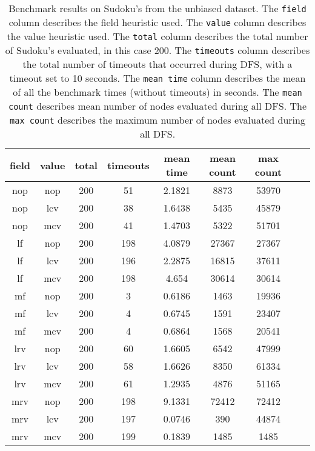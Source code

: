 \documentclass[a4paper]{article}
\begin{document}
\begin{table}[h]
	\begin{adjustbox}{center}
		\begin{tabular}{|c|c|c|c|c|c|c|c|c|}\hline
		\textbf{field} & \textbf{value} & \textbf{total} & \textbf{timeouts} & \textbf{mean time} & \textbf{mean count} & \textbf{max count} \\\hline
		nop & nop & 200 & 51  & 2.1821 & 8873  & 53970 \\\hline
		nop & lcv & 200 & 38  & 1.6438 & 5435  & 45879 \\\hline
		nop & mcv & 200 & 41  & 1.4703 & 5322  & 51701 \\\hline
		lf  & nop & 200 & 198 & 4.0879 & 27367 & 27367 \\\hline
		lf  & lcv & 200 & 196 & 2.2875 & 16815 & 37611 \\\hline
		lf  & mcv & 200 & 198 & 4.654  & 30614 & 30614 \\\hline
		mf  & nop & 200 & 3   & 0.6186 & 1463  & 19936 \\\hline
		mf  & lcv & 200 & 4   & 0.6745 & 1591  & 23407 \\\hline
		mf  & mcv & 200 & 4   & 0.6864 & 1568  & 20541 \\\hline
		lrv & nop & 200 & 60  & 1.6605 & 6542  & 47999 \\\hline
		lrv & lcv & 200 & 58  & 1.6626 & 8350  & 61334 \\\hline
		lrv & mcv & 200 & 61  & 1.2935 & 4876  & 51165 \\\hline
		mrv & nop & 200 & 198 & 9.1331 & 72412 & 72412 \\\hline
		mrv & lcv & 200 & 197 & 0.0746 & 390   & 44874 \\\hline
		mrv & mcv & 200 & 199 & 0.1839 & 1485  & 1485  \\\hline
		\end{tabular}
	\end{adjustbox}
	\caption{
		Benchmark results on Sudoku's from the unbiased dataset. The
		\texttt{field} column describes the field heuristic used. The
		\texttt{value} column describes the value heuristic used. The
		\texttt{total} column describes the total number of Sudoku's evaluated,
		in this case 200. The \texttt{timeouts} column describes the total
		number of timeouts that occurred during DFS, with a timeout set to 10
		seconds. The \texttt{mean time} column describes the mean of all the
		benchmark times (without timeouts) in seconds. The \texttt{mean count}
		describes mean number of nodes evaluated during all DFS. The
		\texttt{max count} describes the maximum number of nodes evaluated
		during all DFS.
	}
	\label{tab: benchmarks}
\end{table}
\end{document}
